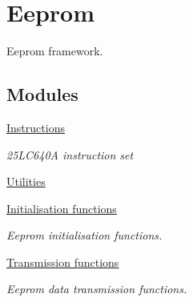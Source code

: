 \hypertarget{group___eeprom}{}\section{Eeprom}
\label{group___eeprom}


Eeprom framework.  


\subsection*{Modules}
\begin{DoxyCompactItemize}
\item 
\hyperlink{group___instructions}{Instructions}
\begin{DoxyCompactList}\small\item\em 25\+L\+C640A instruction set \end{DoxyCompactList}\item 
\hyperlink{group___utilities}{Utilities}
\item 
\hyperlink{group___eeprom___init}{Initialisation functions}
\begin{DoxyCompactList}\small\item\em Eeprom initialisation functions. \end{DoxyCompactList}\item 
\hyperlink{group___eeprom___trans}{Transmission functions}
\begin{DoxyCompactList}\small\item\em Eeprom data transmission functions. \end{DoxyCompactList}\end{DoxyCompactItemize}
